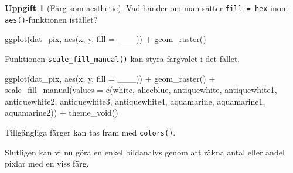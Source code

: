 \documentclass[
]{book}
\newenvironment{Shaded}{\begin{snugshade}}{\end{snugshade}}
\newcommand{\AttributeTok}[1]{\textcolor[rgb]{0.77,0.63,0.00}{#1}}
\newcommand{\FunctionTok}[1]{\textcolor[rgb]{0.00,0.00,0.00}{#1}}
\newcommand{\NormalTok}[1]{#1}
\newcommand{\OtherTok}[1]{\textcolor[rgb]{0.56,0.35,0.01}{#1}}
\newcommand{\SpecialCharTok}[1]{\textcolor[rgb]{0.00,0.00,0.00}{#1}}
\newcommand{\StringTok}[1]{\textcolor[rgb]{0.31,0.60,0.02}{#1}}
\theoremstyle{definition}
\theoremstyle{definition}
\theoremstyle{definition}
\newtheorem{exercise}{Uppgift}[chapter]
\theoremstyle{definition}
\theoremstyle{remark}
\begin{document}
\begin{exercise}[Färg som aesthetic]
Vad händer om man sätter \texttt{fill\ =\ hex} inom \texttt{aes()}-funktionen istället?

\begin{Shaded}
\begin{Highlighting}[]
\FunctionTok{ggplot}\NormalTok{(dat\_pix, }\FunctionTok{aes}\NormalTok{(x, y, }\AttributeTok{fill =}\NormalTok{ \_\_\_)) }\SpecialCharTok{+}
  \FunctionTok{geom\_raster}\NormalTok{()}
\end{Highlighting}
\end{Shaded}

Funktionen \texttt{scale\_fill\_manual()} kan styra färgvalet i det fallet.

\begin{Shaded}
\begin{Highlighting}[]
\FunctionTok{ggplot}\NormalTok{(dat\_pix, }\FunctionTok{aes}\NormalTok{(x, y, }\AttributeTok{fill =}\NormalTok{ \_\_\_)) }\SpecialCharTok{+}
  \FunctionTok{geom\_raster}\NormalTok{() }\SpecialCharTok{+}
  \FunctionTok{scale\_fill\_manual}\NormalTok{(}\AttributeTok{values =} \FunctionTok{c}\NormalTok{(}\StringTok{\textquotesingle{}white\textquotesingle{}}\NormalTok{, }\StringTok{\textquotesingle{}aliceblue\textquotesingle{}}\NormalTok{, }
                               \StringTok{\textquotesingle{}antiquewhite\textquotesingle{}}\NormalTok{, }\StringTok{\textquotesingle{}antiquewhite1\textquotesingle{}}\NormalTok{, }
                               \StringTok{\textquotesingle{}antiquewhite2\textquotesingle{}}\NormalTok{, }\StringTok{\textquotesingle{}antiquewhite3\textquotesingle{}}\NormalTok{, }
                               \StringTok{\textquotesingle{}antiquewhite4\textquotesingle{}}\NormalTok{, }\StringTok{\textquotesingle{}aquamarine\textquotesingle{}}\NormalTok{, }
                               \StringTok{\textquotesingle{}aquamarine1\textquotesingle{}}\NormalTok{, }\StringTok{\textquotesingle{}aquamarine2\textquotesingle{}}\NormalTok{)) }\SpecialCharTok{+}
  \FunctionTok{theme\_void}\NormalTok{()}
\end{Highlighting}
\end{Shaded}

Tillgängliga färger kan tas fram med \texttt{colors()}.
\end{exercise}

Slutligen kan vi nu göra en enkel bildanalys genom att räkna antal eller andel pixlar med en viss färg.

\begin{Shaded}
\end{Shaded}
\end{document}
